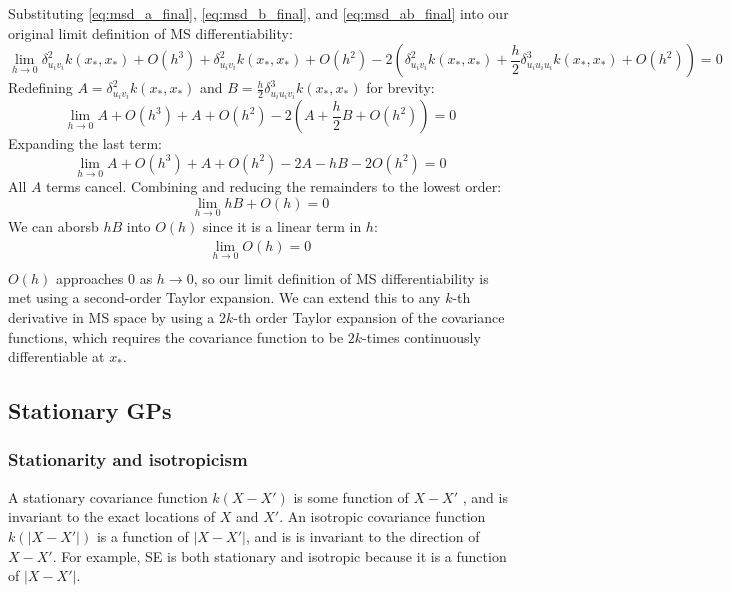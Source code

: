 Substituting \ref{eq:msd_a_final}, \ref{eq:msd_b_final}, and \ref{eq:msd_ab_final} into our original limit definition of MS differentiability:
\begin{equation*}
    \lim_{h \to 0} \delta_{u_i v_i}^2 k(x_*, x_*) + O(h^3) + \delta_{u_i v_i}^2 k(x_*, x_*) + O(h^2) - 2 \left( \delta_{u_i v_i}^2 k(x_*, x_*) + \frac{h}{2} \delta_{u_i u_i u_i}^3 k(x_*, x_*) + O(h^2) \right) = 0 
\end{equation*}
Redefining $A = \delta_{u_i v_i}^2 k(x_*, x_*)$ and $B = \frac{h}{2} \delta_{u_i u_i v_i}^3 k(x_*, x_*)$ for brevity:
\begin{equation*}
    \lim_{h \to 0} A + O(h^3) + A + O(h^2) - 2(A + \frac{h}{2}B + O(h^2)) = 0
\end{equation*}
Expanding the last term:
\begin{equation*}
    \lim_{h \to 0} A + O(h^3) + A + O(h^2) - 2A - hB - 2O(h^2) = 0
\end{equation*}
All $A$ terms cancel. Combining and reducing the remainders to the lowest order:
\begin{equation*}
    \lim_{h \to 0} hB + O(h) = 0
\end{equation*}
We can aborsb $hB$ into $O(h)$ since it is a linear term in $h$:
\begin{equation} \label{eq:ms_differentiability}
    \begin{aligned}
        \lim_{h \to 0} O(h) = 0 \\
    \end{aligned}
\end{equation}
$O(h)$ approaches $0$ as $h \to 0$, so our limit definition of MS differentiability is met using a second-order Taylor expansion. We can extend this to any $k$-th derivative in MS space by using a $2k$-th order Taylor expansion of the covariance functions, which requires the covariance function to be $2k$-times continuously differentiable at $x_*$.

\subsection{Stationary GPs \cite{gp-ml}}

\subsubsection{Stationarity and isotropicism}
A stationary covariance function $k(X - X')$ is some function of $X - X'$ , and is invariant to the exact locations of $X$ and $X'$. An isotropic covariance function $k(|X - X'|)$ is a function of $|X - X'|$, and is is invariant to the direction of $X - X'$. For example, SE \cite{eq:se} is both stationary and isotropic because it is a function of $|X - X'|$.


